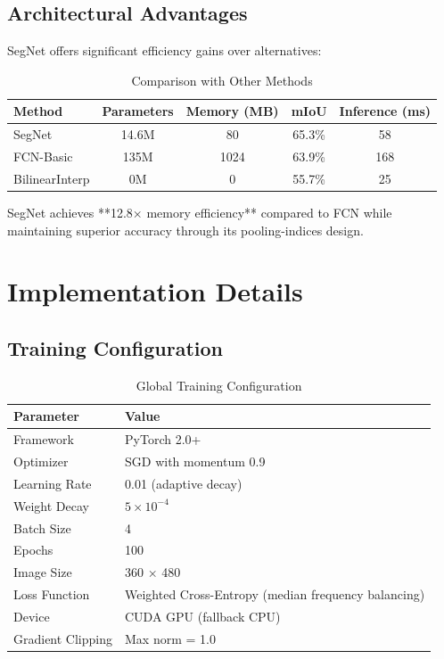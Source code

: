 \documentclass[11pt,a4paper]{report}
\begin{document}
\section{Architectural Advantages}

SegNet offers significant efficiency gains over alternatives:

\begin{table}[H]
\centering
\caption{Comparison with Other Methods}
\label{tab:comparison}
\begin{tabular}{lcccc}
\toprule
\rowcolor{tableheader}
\textbf{Method} & \textbf{Parameters} & \textbf{Memory (MB)} & \textbf{mIoU} & \textbf{Inference (ms)} \\
\midrule
SegNet & 14.6M & 80 & 65.3\% & 58 \\
FCN-Basic & 135M & 1024 & 63.9\% & 168 \\
BilinearInterp & 0M & 0 & 55.7\% & 25 \\
\bottomrule
\end{tabular}
\end{table}

SegNet achieves **12.8× memory efficiency** compared to FCN while maintaining superior accuracy through its pooling-indices design.

\chapter{Implementation Details}

\section{Training Configuration}

\begin{table}[H]
\centering
\caption{Global Training Configuration}
\label{tab:config}
\begin{tabular}{ll}
\toprule
\rowcolor{tableheader}
\textbf{Parameter} & \textbf{Value} \\
\midrule
Framework & PyTorch 2.0+ \\
Optimizer & SGD with momentum 0.9 \\
Learning Rate & 0.01 (adaptive decay) \\
Weight Decay & $5 \times 10^{-4}$ \\
Batch Size & 4 \\
Epochs & 100 \\
Image Size & 360 × 480 \\
Loss Function & Weighted Cross-Entropy (median frequency balancing) \\
Device & CUDA GPU (fallback CPU) \\
Gradient Clipping & Max norm = 1.0 \\
\bottomrule
\end{tabular}
\end{table}
\end{document}
